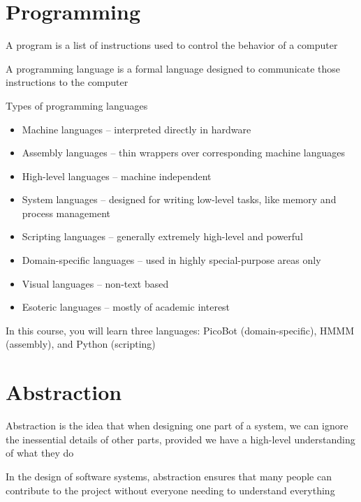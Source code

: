 \documentclass[8pt,a4paper,compress]{beamer}
\begin{document}
\section{Programming}
\begin{frame}[fragile]
\pause

A program is a list of instructions used to control the behavior of a computer

\pause
\bigskip

A programming language is a formal language designed to communicate those instructions to the computer

\pause
\bigskip

Types of programming languages
\begin{itemize}
\item Machine languages -- interpreted directly in hardware
\item Assembly languages -- thin wrappers over corresponding machine languages
\item High-level languages -- machine independent
\item System languages -- designed for writing low-level tasks, like memory and process management
\item Scripting languages -- generally extremely high-level and powerful
\item Domain-specific languages -- used in highly special-purpose areas only
\item Visual languages -- non-text based
\item Esoteric languages -- mostly of academic interest
\end{itemize}

\pause
\bigskip

In this course, you will learn three languages: PicoBot (domain-specific), HMMM (assembly), and Python (scripting)
\end{frame}

\section{Abstraction}
\begin{frame}[fragile]
\pause

Abstraction is the idea that when designing one part of a system, we can ignore the inessential details of other parts, provided we have a high-level understanding of what they do

\pause
\bigskip

In the design of software systems, abstraction ensures that many people can contribute to the project without everyone needing to understand everything
\end{frame}
\end{document}
